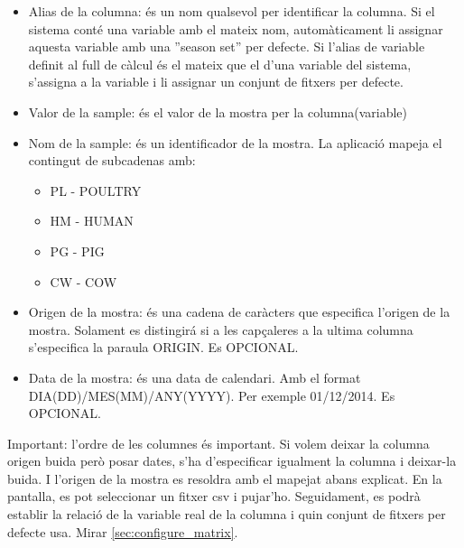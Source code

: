 \begin{itemize}
\item Alias de la columna: \'{e}s un nom qualsevol per identificar la columna. Si el sistema cont\'{e} una variable amb el mateix nom, autom\`{a}ticament li assignar aquesta variable amb una ''season set'' per defecte. Si l'alias de variable definit al full de c\`{a}lcul \'{e}s el mateix que el d'una variable del sistema, s'assigna a la variable i li assignar un conjunt de fitxers per defecte.
\item Valor de la sample: \'{e}s el valor de la mostra per la columna(variable)
\item Nom de la sample: \'{e}s un identificador de la mostra. La aplicaci\'{o} mapeja el contingut de subcadenas amb:
\begin{itemize}
\item PL - POULTRY
\item HM - HUMAN
\item PG - PIG
\item CW - COW
\end{itemize}
\item Origen de la mostra: \'{e}s una cadena de caràcters que especifica l'origen de la mostra. Solament es distingir\'{a} si a les capçaleres a la ultima columna s'especifica la paraula ORIGIN. Es OPCIONAL. 
\item Data de la mostra: \'{e}s una data de calendari. Amb el format DIA(DD)/MES(MM)/ANY(YYYY). Per exemple 01/12/2014. Es OPCIONAL. 
\end{itemize}
Important: l'ordre de les columnes \'{e}s important. Si volem deixar la columna origen buida però posar dates, s'ha d'especificar igualment la columna i deixar-la buida. I l'origen de la mostra es resoldra amb el mapejat abans explicat.
En la pantalla, es pot seleccionar un fitxer csv i pujar'ho. Seguidament, es podr\`{a} establir la relaci\'{o} de la variable real de la columna i quin conjunt de fitxers per defecte usa. Mirar \ref{sec:configure_matrix}.

